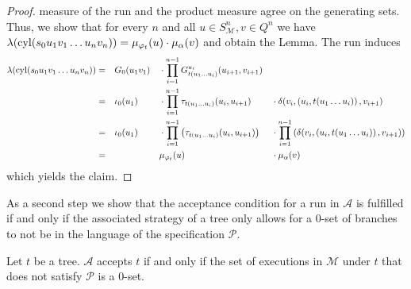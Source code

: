 \begin{proof}
  measure of the run and the product measure agree on the generating sets.
  Thus, we show that for every $n$ and all $u\in S_{\mathcal{M}}^{n},
  v\in Q^{n}$ we have $\lambda(\operatorname{cyl}(s_{0}u_{1}v_{1}\dots u_{n}v_{n})) =
  \mu_{\varphi_{t}}(u)\cdot\mu_{\alpha}(v)$ and obtain the Lemma. The run
  induces
  \begin{alignat*}{4}
    \lambda(\operatorname{cyl}(s_{0}u_{1}v_{1}\dots u_{n}v_{n})) &=&
    &G_{0}(u_{1}v_{1})&&\cdot\prod\limits_{i = 1}^{n-1}
    G^{u_{i}}_{t(u_{1}\dots u_{i})}(u_{i+1}, v_{i+1})&&\\
    &=&&\iota_{0}(u_{1})&&\cdot\prod\limits_{i = 1}^{n-1}
    \tau_{t(u_{1}\dots u_{i})}(u_{i}, u_{i+1})&&\cdot
    \delta(v_{i}, \left(u_{i}, t(u_{1}\dots u_{i})\right), v_{i+1})\\
    &=&&\iota_{0}(u_{1})&&\cdot\prod\limits_{i = 1}^{n-1}\left(
      \tau_{t(u_{1}\dots u_{i})}(u_{i}, u_{i+1})\right)
    &&\cdot\prod\limits_{i = 1}^{n-1}\left(
      \delta(v_{i}, \left(u_{i}, t(u_{1}\dots u_{i})\right), v_{i+1})\right)\\
    &=&&&&\mu_{\varphi_{t}}(u)&&\cdot\mu_{\alpha}(v)
  \end{alignat*}
  which yields the claim.
\end{proof}
As a second step we show that the acceptance condition for a run in
$\mathcal{A}$ is fulfilled if and only if the associated strategy of a tree
only allows for a 0-set of branches to not be in the language of the
specification $\mathcal{P}$.
\begin{lemma}
  Let $t$ be a tree. $\mathcal{A}$ accepts $t$ if and only if the set of
  executions in $\mathcal{M}$ under $t$ that does not satisfy $\mathcal{P}$ is
  a 0-set.
\end{lemma}
